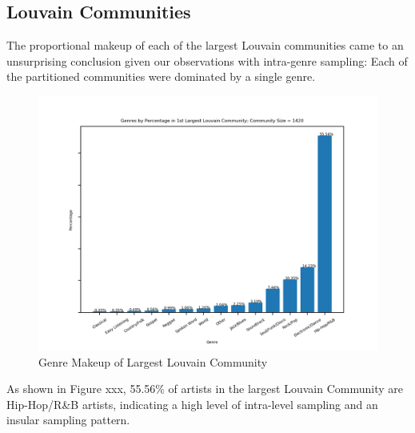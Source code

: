 \documentclass[pageno]{jpaper}
\begin{document}
\subsection{Louvain Communities}
\begin{table}[H]
\caption{Top Genre Makeup in n'th Largest Louvain Communities}
\end{table}
The proportional makeup of each of the largest Louvain communities came to an unsurprising conclusion given our observations with intra-genre sampling: Each of the partitioned communities were dominated by a single genre.
\begin{figure}[H]
\includegraphics{LouvainCommunities/louvain1st}
\caption{Genre Makeup of Largest Louvain Community}
\centering
\end{figure}
As shown in Figure xxx, 55.56\% of artists in the largest Louvain Community are Hip-Hop/R\&B artists, indicating a high level of intra-level sampling and an insular sampling pattern. 
\end{document}
